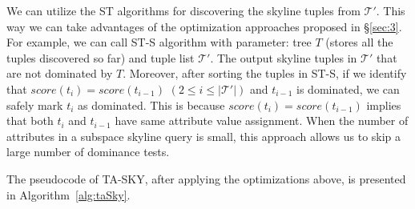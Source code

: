 
\vspace{1mm}
 We can utilize the ST algorithms for discovering the skyline tuples from $\mathcal{T'}$. This way we can take advantages of the optimization approaches proposed in \S\ref{sec:3}. For example, we can call ST-S algorithm with parameter: tree $T$ (stores all the tuples discovered so far) and tuple list $\mathcal{T'}$. The output skyline tuples in  $\mathcal{T'}$ that are not dominated by $T$. Moreover, after sorting the tuples in ST-S, if we identify that $score(t_i) = score(t_{i-1})$ $(2 \leq i \leq |\mathcal{T'}|)$ and $t_{i-1}$ is dominated, we can safely mark $t_i$ as dominated. This is because $score(t_i) = score(t_{i-1})$ implies that both $t_i$ and $t_{i-1}$ have same attribute value assignment. When the number of attributes in a subspace skyline query is small, this approach allows us to skip a large number of dominance tests.


The pseudocode of TA-SKY, after applying the optimizations above, is presented in Algorithm~\ref{alg:taSky}.


